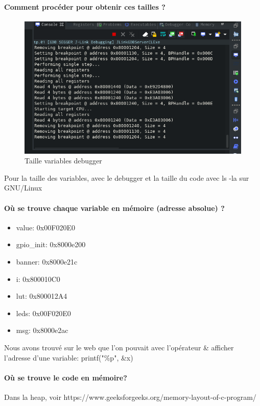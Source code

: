 \documentclass[a4paper]{article}
\begin{document}
\paragraph{Comment procéder pour obtenir ces tailles ?}
\begin{figure}
   \includegraphics[width=.8\textwidth]{debug.png}
   \caption{Taille variables debugger}
\end{figure}

Pour la taille des variables, avec le debugger et la taille du code avec ls -la sur GNU/Linux

\paragraph{ Où se trouve chaque variable en mémoire (adresse absolue) ?}
\begin{itemize}
   \item value: 0x00F020E0
   \item gpio\_init: 0x8000e200
   \item banner: 0x8000e21c
   \item i: 0x800010C0
   \item lut: 0x800012A4 
   \item leds: 0x00F020E0
   \item msg: 0x8000e2ac
\end{itemize}
Nous avons trouvé sur le web que l'on pouvait avec l'opérateur \& afficher l'adresse d'une variable: printf("\%p\n", &x)

\paragraph{ Où se trouve le code en mémoire?}
Dans la heap, voir https://www.geeksforgeeks.org/memory-layout-of-c-program/
\end{document}
